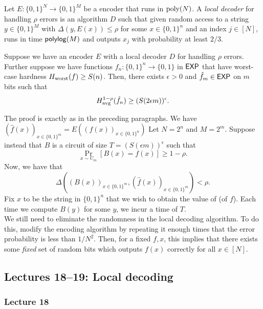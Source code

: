 		\begin{fdef}
			Let $E : \{0,1\}^N \to \{0,1\}^M$ be a encoder that runs in $\operatorname{poly}(N)$. A \emph{local decoder} for handling $\rho$ errors is an algorithm $D$ such that given random access to a string $y \in \{0,1\}^M$ with $\Delta(y,E(x)) \le \rho$ for some $x \in \{0,1\}^n$ and an index $j \in [N]$, runs in time $\mathsf{polylog}(M)$ and outputs $x_j$ with probability at least $2/3$.
		\end{fdef}

		\begin{ftheo}
			Suppose we have an encoder $E$ with a local decoder $D$ for handling $\rho$ errors. Further suppose we have functions $f_n : \{0,1\}^n \to \{0,1\}$ in $\mathsf{EXP}$ that have worst-case hardness $H_{\text{worst}}(f) \ge S(n)$. Then, there exists $\epsilon > 0$ and $\hat{f}_{m} \in \mathsf{EXP}$ on $m$ bits such that
			\[ H_{\text{avg}}^{1-\rho}(\hat{f}_n) \ge (S (2 \epsilon m))^{\epsilon}. \]
		\end{ftheo}
		The proof is exactly as in the preceding paragraphs. We have $(\hat{f}(x))_{x \in \{0,1\}^m} = E( (f(x))_{x \in \{0,1\}^n} )$ Let $N = 2^n$ and $M = 2^m$. Suppose instead that $B$ is a circuit of size  $T = (S(\epsilon m))^\epsilon$ such that
		\[ \Pr_{x \sim U_m}[B(x) = f(x)] \ge 1 - \rho. \]
		Now, we have that
		\[ \Delta( ( B(x) )_{x \in \{0,1\}^m} , ( \hat{f}(x) )_{x \in \{0,1\}^m} ) < \rho. \]
		Fix $x$ to be the string in $\{0,1\}^n$ that we wish to obtain the value of (of $f$). Each time we compute $B(y)$ for some $y$, we incur a time of $T$.\\
		We still need to eliminate the randomness in the local decoding algorithm. To do this, modify the encoding algorithm by repeating it enough times that the error probability is less than $1/N^2$. Then, for a fixed $f,x$, this implies that there exists some \emph{fixed} set of random bits which outputs $f(x)$ correctly for all $x \in [N]$.

\subsection{Lectures 18--19: Local decoding}

	\subsubsection{Lecture 18}

